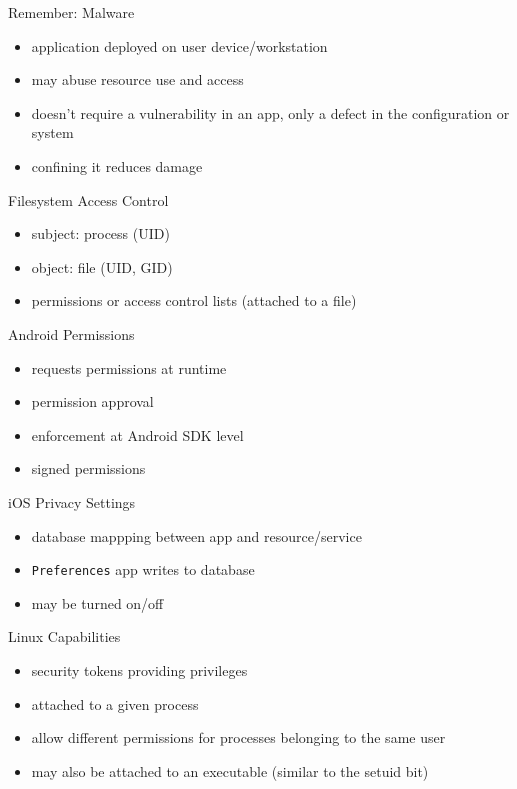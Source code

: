 \documentclass{curs}
\begin{document}
\begin{frame}{Remember: Malware}
  \begin{itemize}
    \pause \item application deployed on user device/workstation
    \pause \item may abuse resource use and access
    \pause \item doesn't require a vulnerability in an app, only a defect in the configuration or system
    \pause \item confining it reduces damage
  \end{itemize}
\end{frame}

\begin{frame}{Filesystem Access Control}
  \begin{itemize}
    \pause \item subject: process (UID)
    \pause \item object: file (UID, GID)
    \pause \item permissions or access control lists (attached to a file)
  \end{itemize}
\end{frame}

\begin{frame}{Android Permissions}
  \begin{itemize}
    \pause \item requests permissions at runtime
    \pause \item permission approval
    \pause \item enforcement at Android SDK level
    \pause \item signed permissions
  \end{itemize}
\end{frame}

\begin{frame}{iOS Privacy Settings}
  \begin{itemize}
    \item database mappping between app and resource/service
    \item \texttt{Preferences} app writes to database
    \item may be turned on/off
  \end{itemize}
\end{frame}

\begin{frame}{Linux Capabilities}
  \begin{itemize}
    \item security tokens providing privileges
    \item attached to a given process
    \item allow different permissions for processes belonging to the same user
    \item may also be attached to an executable (similar to the setuid bit)
  \end{itemize}
\end{frame}
\end{document}
